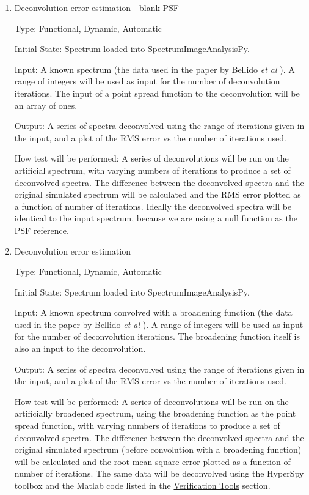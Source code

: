 \documentclass[12pt, titlepage]{article}
\newcommand{\progname}{SpectrumImageAnalysisPy}
\begin{document}
\begin{enumerate}

\item{Deconvolution error estimation - blank PSF}
\label{TFR:RLblankPSF}

Type: Functional, Dynamic, Automatic

Initial State: Spectrum loaded into \progname{}.

Input: A known spectrum (the data used in the paper by Bellido
\textit{et al} \cite{bellido_toward_2014}).
 A range of integers will be
used as input for the number of deconvolution iterations. The input of a
point spread function to the deconvolution will be an array of ones.

Output: A series of spectra deconvolved using the range of iterations given in
the input, and a plot of the RMS error vs the number of iterations used.

How test will be performed: A series of deconvolutions will be run on the
artificial spectrum, with varying numbers of iterations to produce a set of
deconvolved spectra. The difference between the deconvolved spectra and the
original simulated spectrum will be calculated and the RMS error plotted as a
function of number of iterations. Ideally the deconvolved spectra will be
identical to the input spectrum, because we are using a null function as the PSF
reference.\\


\item{Deconvolution error estimation}
\label{TFR:RLerror}

Type: Functional, Dynamic, Automatic
					
Initial State: Spectrum loaded into \progname{}.

Input: A known spectrum convolved with a broadening function (the data used in
the paper by Bellido \textit{et al} \cite{bellido_toward_2014}). A range of
integers will be used as input for the number of deconvolution iterations. The
broadening function itself is also an input to the deconvolution.

Output: A series of spectra deconvolved using the range of iterations given in
the input, and a plot of the RMS error vs the number of iterations used.
					
How test will be performed: A series of deconvolutions will be run on the
artificially broadened spectrum, using the broadening function as the point
spread function, with varying numbers of iterations to produce a set of
deconvolved spectra. The difference between the deconvolved spectra and the
original simulated spectrum (before convolution with a broadening function) will
be calculated and the root mean square error plotted as a function of number of
iterations. The same data will be deconvolved using the HyperSpy toolbox and the
Matlab code listed in the \hyperref[subsec:VerificationTools]{Verification
Tools} section.\\



\end{enumerate}
\end{document}
